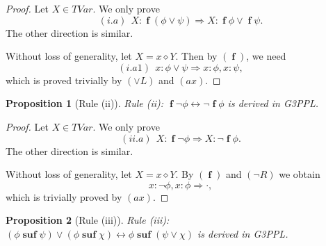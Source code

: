 \documentclass[manuscript,screen]{acmart}
\newtheorem{prop}{Proposition}[section]
\newcommand{\cat}[0]{\diamond}
\newcommand{\GiiiPPLcyc}[0]{\mbox{G3PPL}}
\DeclareMathOperator{\ofst}{\mathbf{f}}
\DeclareMathOperator{\osuf}{\mathbf{suf}}
\newcommand{\TVar}[0]{\textit{TVar}}
\begin{document}
\begin{proof}
Let $X\in \TVar$. 
We only prove 
$$
(i.a)\ \ X : \ofst(\phi\vee\psi)\Rightarrow X : \ofst\phi\vee\ofst \psi.
$$
The other direction is similar. 

Without loss of generality, let $X=x\cat Y$. 
Then by $(\ofst)$, we need 
$$
(i.a1)\ \ x : \phi\vee\psi \Rightarrow x : \phi, x : \psi, 
$$
which is proved trivially by $(\vee L)$ and $(ax)$. 
\end{proof}

\begin{prop}[Rule (ii)]
Rule (ii):
$\ofst \neg \phi\leftrightarrow \neg\ofst \phi$
 is derived in \GiiiPPLcyc. 
\end{prop}

\begin{proof}
Let $X\in \TVar$. 
We only prove 
$$
(ii.a)\ \ X : \ofst \neg \phi\Rightarrow X : \neg\ofst \phi. 
$$
The other direction is similar. 

Without loss of generality, let $X=x\cat Y$. 
By $(\ofst)$ and $(\neg R)$ we obtain
$$
x : \neg\phi, x : \phi\Rightarrow \cdot, 
$$
which is trivially proved by $(ax)$. 
\end{proof}

\begin{prop}[Rule (iii)]
\label{prop:Rule (iii)}
Rule (iii):
$(\phi\osuf \psi)\vee (\phi\osuf \chi)\leftrightarrow \phi\osuf (\psi\vee \chi)$
 is derived in \GiiiPPLcyc. 
\end{prop}
\end{document}
